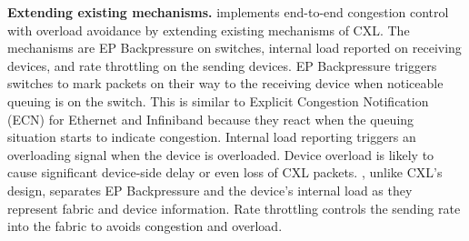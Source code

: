 \noindent \textbf{Extending existing mechanisms.}
%
\aurelia implements end-to-end congestion control with overload avoidance by extending existing mechanisms of CXL. 
%
The mechanisms are EP Backpressure on switches, internal load reported on receiving devices, and rate throttling on the sending devices.
%
%
EP Backpressure triggers switches to mark packets on their way to the receiving device when noticeable queuing is on the switch.  
%
This is similar to Explicit Congestion Notification (ECN) for Ethernet and Infiniband because they react when the queuing situation starts to indicate congestion.
%
Internal load reporting triggers an overloading signal when the device is overloaded. 
%
Device overload is likely to cause significant device-side delay or even loss of CXL packets.
%
\aurelia, unlike CXL's design, separates EP Backpressure and the device's internal load as they represent fabric and device information. 
%
%
Rate throttling controls the sending rate into the fabric to avoids congestion and overload. 
%
%

